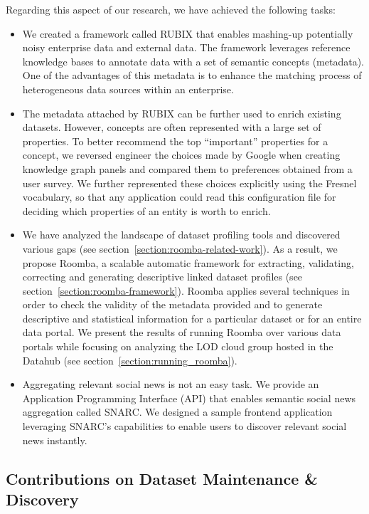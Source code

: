 Regarding this aspect of our research, we have achieved the following tasks:
\begin{itemize}
	\item We created a framework called RUBIX that enables mashing-up potentially noisy enterprise data and external data. The framework leverages reference knowledge bases to annotate data with a set of semantic concepts (metadata). One of the advantages of this metadata is to enhance the matching process of heterogeneous data sources within an enterprise.
	\item The metadata attached by RUBIX can be further used to enrich existing datasets. However, concepts are often represented with a large set of properties. To better recommend the top ``important'' properties for a concept, we reversed engineer the choices made by Google when creating knowledge graph panels and compared them to preferences obtained from a user survey. We further represented these choices explicitly using the Fresnel vocabulary, so that any application could read this configuration file for deciding which properties of an entity is worth to enrich.
	\item We have analyzed the landscape of dataset profiling tools and discovered various gaps (see section~\ref{section:roomba-related-work}). As a result, we propose Roomba, a scalable automatic framework for extracting, validating, correcting and generating descriptive linked dataset profiles (see section~\ref{section:roomba-framework}). Roomba applies several techniques in order to check the validity of the metadata provided and to generate descriptive and statistical information for a particular dataset or for an entire data portal. We present the results of running Roomba over various data portals while focusing on analyzing the LOD cloud group hosted in the Datahub (see section~\ref{section:running_roomba}).
	\item Aggregating relevant social news is not an easy task. We provide an Application Programming Interface (API) that enables semantic social news aggregation called SNARC. We designed a sample frontend application leveraging SNARC's capabilities to enable users to discover relevant social news instantly.
\end{itemize}

\subsection{Contributions on Dataset Maintenance \& Discovery}

